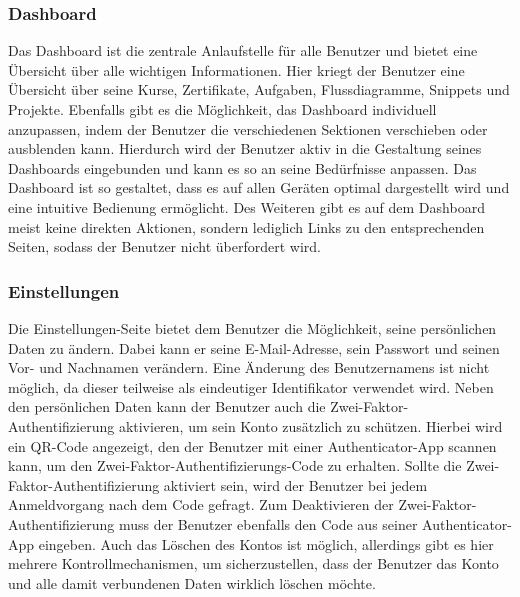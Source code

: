 \documentclass[main.tex]{subfiles}
\begin{document}
    \subsubsection{Dashboard}
    Das Dashboard ist die zentrale Anlaufstelle für alle Benutzer und bietet eine Übersicht über alle wichtigen Informationen.
    Hier kriegt der Benutzer eine Übersicht über seine Kurse, Zertifikate, Aufgaben, Flussdiagramme, Snippets und Projekte.
    Ebenfalls gibt es die Möglichkeit, das Dashboard individuell anzupassen, indem der Benutzer die verschiedenen Sektionen verschieben oder ausblenden kann.
    Hierdurch wird der Benutzer aktiv in die Gestaltung seines Dashboards eingebunden und kann es so an seine Bedürfnisse anpassen.
    Das Dashboard ist so gestaltet, dass es auf allen Geräten optimal dargestellt wird und eine intuitive Bedienung ermöglicht.
    Des Weiteren gibt es auf dem Dashboard meist keine direkten Aktionen, sondern lediglich Links zu den entsprechenden Seiten, sodass der Benutzer nicht überfordert wird.
    \subsubsection{Einstellungen}
    Die Einstellungen-Seite bietet dem Benutzer die Möglichkeit, seine persönlichen Daten zu ändern.
    Dabei kann er seine E-Mail-Adresse, sein Passwort und seinen Vor- und Nachnamen verändern.
    Eine Änderung des Benutzernamens ist nicht möglich, da dieser teilweise als eindeutiger Identifikator verwendet wird.
    Neben den persönlichen Daten kann der Benutzer auch die Zwei-Faktor-Authentifizierung aktivieren, um sein Konto zusätzlich zu schützen.
    Hierbei wird ein QR-Code angezeigt, den der Benutzer mit einer Authenticator-App scannen kann, um den Zwei-Faktor-Authentifizierungs-Code zu erhalten.
    Sollte die Zwei-Faktor-Authentifizierung aktiviert sein, wird der Benutzer bei jedem Anmeldvorgang nach dem Code gefragt.
    Zum Deaktivieren der Zwei-Faktor-Authentifizierung muss der Benutzer ebenfalls den Code aus seiner Authenticator-App eingeben.
    Auch das Löschen des Kontos ist möglich, allerdings gibt es hier mehrere Kontrollmechanismen, um sicherzustellen, dass der Benutzer das Konto und alle damit verbundenen Daten wirklich löschen möchte.
\end{document}
